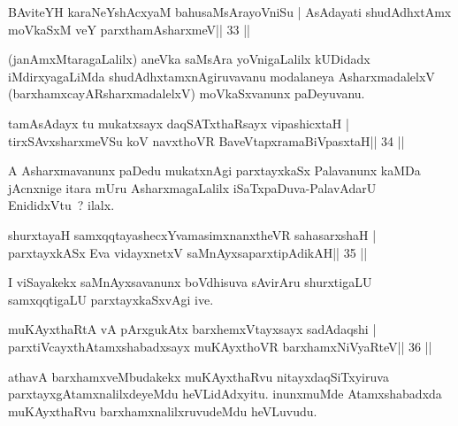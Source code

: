 

\begin{shl}
BAviteYH karaNeYshAcxyaM bahusaMsArayoVniSu |
AsAdayati shudAdhxtAmx moVkaSxM veY parxthamAsharxmeV\hfill || 33 ||
\end{shl}

\begin{artha}
(janAmxMtaragaLalilx) aneVka saMsAra yoVnigaLalilx kUDidadx iMdirxyagaLiMda shudAdhxtamxnAgiruvavanu modalaneya AsharxmadalelxV (barxhamxcayARsharxmadalelxV) moVkaSxvanunx paDeyuvanu.
\end{artha}

\begin{shl}
tamAsAdayx tu mukatxsayx daqSATxthaRsayx vipashicxtaH |
tirxSAvxsharxmeVSu koV navxthoVR BaveVtapxramaBiVpasxtaH\hfill || 34 ||
\end{shl}

\begin{artha}
A Asharxmavanunx paDedu mukatxnAgi parxtayxkaSx Palavanunx kaMDa jAcnxnige itara mUru AsharxmagaLalilx iSaTxpaDuva-PalavAdarU EnididxVtu~? ilalx.
\end{artha}

\begin{shl}
shurxtayaH samxqqtayashecxYvamasimxnanxtheVR sahasarxshaH |
parxtayxkASx Eva vidayxnetxV saMnAyxsaparxtipAdikAH\hfill || 35 ||
\end{shl}

\begin{artha}
I viSayakekx saMnAyxsavanunx boVdhisuva sAvirAru shurxtigaLU
samxqqtigaLU parxtayxkaSxvAgi ive.
\end{artha}


\begin{shl}
muKAyxthaRtA vA pArxgukAtx barxhemxVtayxsayx sadAdaqshi |
parxtiVcayxthA\s tamxshabadxsayx muKAyxthoVR barxhamxNiVyaRteV\hfill || 36 ||
\end{shl}

\begin{artha}
athavA barxhamxveMbudakekx muKAyxthaRvu nitayxdaqSiTxyiruva
parxtayxgAtamxnalilxdeyeMdu heVLidAdxyitu. inunxmuMde Atamxshabadxda
muKAyxthaRvu barxhamxnalilxruvudeMdu heVLuvudu.
\end{artha}


